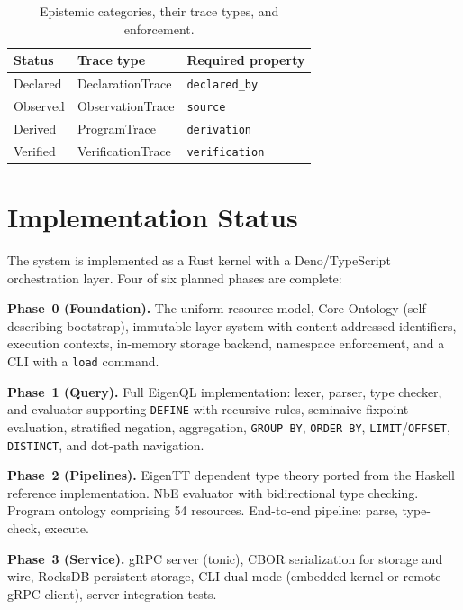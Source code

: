 \documentclass[10pt,twocolumn,letterpaper]{article}
\newcommand{\code}[1]{\texttt{\small #1}}
\begin{document}
\begin{table}[t]
  \centering
  \small
  \caption{Epistemic categories, their trace types, and enforcement.}
  \label{tab:epistemic}
  \begin{tabular}{@{}lll@{}}
    \toprule
    \textbf{Status} & \textbf{Trace type} & \textbf{Required property} \\
    \midrule
    Declared & DeclarationTrace & \code{declared\_by} \\
    Observed & ObservationTrace & \code{source} \\
    Derived  & ProgramTrace     & \code{derivation} \\
    Verified & VerificationTrace & \code{verification} \\
    \bottomrule
  \end{tabular}
\end{table}


\section{Implementation Status}
\label{sec:impl}

The system is implemented as a Rust kernel with a Deno/TypeScript orchestration layer.
Four of six planned phases are complete:

\textbf{Phase~0 (Foundation).}
The uniform resource model, Core Ontology (self-describing bootstrap), immutable layer system with content-addressed identifiers, execution contexts, in-memory storage backend, namespace enforcement, and a CLI with a \code{load} command.

\textbf{Phase~1 (Query).}
Full EigenQL implementation: lexer, parser, type checker, and evaluator supporting \code{DEFINE} with recursive rules, seminaive fixpoint evaluation, stratified negation, aggregation, \code{GROUP BY}, \code{ORDER BY}, \code{LIMIT}/\code{OFFSET}, \code{DISTINCT}, and dot-path navigation.

\textbf{Phase~2 (Pipelines).}
EigenTT dependent type theory ported from the Haskell reference implementation.
NbE evaluator with bidirectional type checking.
Program ontology comprising 54 resources.
End-to-end pipeline: parse, type-check, execute.

\textbf{Phase~3 (Service).}
gRPC server (tonic), CBOR serialization for storage and wire, RocksDB persistent storage, CLI dual mode (embedded kernel or remote gRPC client), server integration tests.
\end{document}
